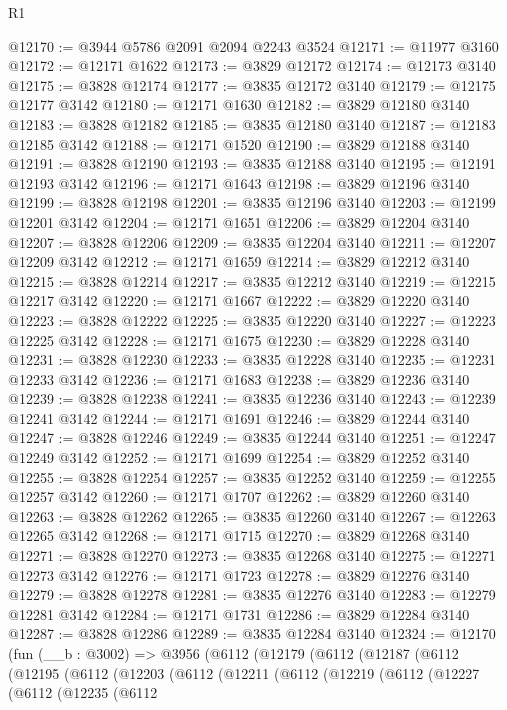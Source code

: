 \begin{lexlean}{R1}
\begin{coremodule}
@12170 := @3944 @5786 @2091 @2094 @2243 @3524
@12171 := @11977 @3160
@12172 := @12171 @1622
@12173 := @3829 @12172
@12174 := @12173 @3140
@12175 := @3828 @12174
@12177 := @3835 @12172 @3140
@12179 := @12175 @12177 @3142
@12180 := @12171 @1630
@12182 := @3829 @12180 @3140
@12183 := @3828 @12182
@12185 := @3835 @12180 @3140
@12187 := @12183 @12185 @3142
@12188 := @12171 @1520
@12190 := @3829 @12188 @3140
@12191 := @3828 @12190
@12193 := @3835 @12188 @3140
@12195 := @12191 @12193 @3142
@12196 := @12171 @1643
@12198 := @3829 @12196 @3140
@12199 := @3828 @12198
@12201 := @3835 @12196 @3140
@12203 := @12199 @12201 @3142
@12204 := @12171 @1651
@12206 := @3829 @12204 @3140
@12207 := @3828 @12206
@12209 := @3835 @12204 @3140
@12211 := @12207 @12209 @3142
@12212 := @12171 @1659
@12214 := @3829 @12212 @3140
@12215 := @3828 @12214
@12217 := @3835 @12212 @3140
@12219 := @12215 @12217 @3142
@12220 := @12171 @1667
@12222 := @3829 @12220 @3140
@12223 := @3828 @12222
@12225 := @3835 @12220 @3140
@12227 := @12223 @12225 @3142
@12228 := @12171 @1675
@12230 := @3829 @12228 @3140
@12231 := @3828 @12230
@12233 := @3835 @12228 @3140
@12235 := @12231 @12233 @3142
@12236 := @12171 @1683
@12238 := @3829 @12236 @3140
@12239 := @3828 @12238
@12241 := @3835 @12236 @3140
@12243 := @12239 @12241 @3142
@12244 := @12171 @1691
@12246 := @3829 @12244 @3140
@12247 := @3828 @12246
@12249 := @3835 @12244 @3140
@12251 := @12247 @12249 @3142
@12252 := @12171 @1699
@12254 := @3829 @12252 @3140
@12255 := @3828 @12254
@12257 := @3835 @12252 @3140
@12259 := @12255 @12257 @3142
@12260 := @12171 @1707
@12262 := @3829 @12260 @3140
@12263 := @3828 @12262
@12265 := @3835 @12260 @3140
@12267 := @12263 @12265 @3142
@12268 := @12171 @1715
@12270 := @3829 @12268 @3140
@12271 := @3828 @12270
@12273 := @3835 @12268 @3140
@12275 := @12271 @12273 @3142
@12276 := @12171 @1723
@12278 := @3829 @12276 @3140
@12279 := @3828 @12278
@12281 := @3835 @12276 @3140
@12283 := @12279 @12281 @3142
@12284 := @12171 @1731
@12286 := @3829 @12284 @3140
@12287 := @3828 @12286
@12289 := @3835 @12284 @3140
@12324 := @12170
    (fun (__b : @3002) =>
    @3956
      (@6112
        (@12179
          (@6112
            (@12187
              (@6112
                (@12195
                  (@6112
                    (@12203
                      (@6112
                        (@12211
                          (@6112
                            (@12219
                              (@6112
                                (@12227
                                  (@6112
                                    (@12235
                                      (@6112

\end{coremodule}
\end{lexlean}
